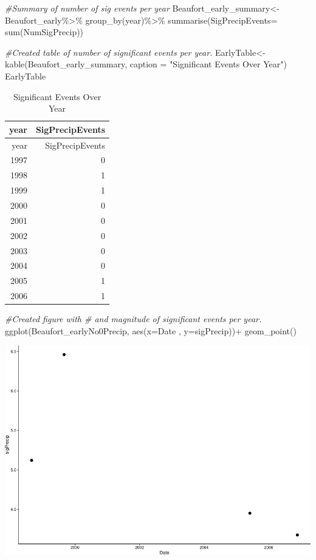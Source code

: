 \documentclass[
  12pt,
]{article}
\newenvironment{Shaded}{\begin{snugshade}}{\end{snugshade}}
\newcommand{\AttributeTok}[1]{\textcolor[rgb]{0.77,0.63,0.00}{#1}}
\newcommand{\CommentTok}[1]{\textcolor[rgb]{0.56,0.35,0.01}{\textit{#1}}}
\newcommand{\FunctionTok}[1]{\textcolor[rgb]{0.00,0.00,0.00}{#1}}
\newcommand{\NormalTok}[1]{#1}
\newcommand{\OtherTok}[1]{\textcolor[rgb]{0.56,0.35,0.01}{#1}}
\newcommand{\SpecialCharTok}[1]{\textcolor[rgb]{0.00,0.00,0.00}{#1}}
\newcommand{\StringTok}[1]{\textcolor[rgb]{0.31,0.60,0.02}{#1}}
\begin{document}
\begin{Shaded}
\begin{Highlighting}[]
\CommentTok{\#Summary of number of sig events per year}
\NormalTok{Beaufort\_early\_summary}\OtherTok{\textless{}{-}}\NormalTok{ Beaufort\_early}\SpecialCharTok{\%\textgreater{}\%}
  \FunctionTok{group\_by}\NormalTok{(year)}\SpecialCharTok{\%\textgreater{}\%}
  \FunctionTok{summarise}\NormalTok{(}\AttributeTok{SigPrecipEvents=} \FunctionTok{sum}\NormalTok{(NumSigPrecip))}

\CommentTok{\#Created table of number of significant events per year.}
\NormalTok{EarlyTable}\OtherTok{\textless{}{-}} \FunctionTok{kable}\NormalTok{(Beaufort\_early\_summary, }\AttributeTok{caption =} \StringTok{"Significant Events Over Year"}\NormalTok{)}
\NormalTok{EarlyTable}
\end{Highlighting}
\end{Shaded}

\begin{longtable}[]{@{}rr@{}}
\caption{Significant Events Over Year}\tabularnewline
\toprule
year & SigPrecipEvents \\
\midrule
\endfirsthead
\toprule
year & SigPrecipEvents \\
\midrule
\endhead
1997 & 0 \\
1998 & 1 \\
1999 & 1 \\
2000 & 0 \\
2001 & 0 \\
2002 & 0 \\
2003 & 0 \\
2004 & 0 \\
2005 & 1 \\
2006 & 1 \\
\bottomrule
\end{longtable}

\begin{Shaded}
\begin{Highlighting}[]
\CommentTok{\#Created figure with \# and magnitude of significant events per year.}
\FunctionTok{ggplot}\NormalTok{(Beaufort\_earlyNo0Precip, }\FunctionTok{aes}\NormalTok{(}\AttributeTok{x=}\NormalTok{Date , }\AttributeTok{y=}\NormalTok{sigPrecip))}\SpecialCharTok{+}
  \FunctionTok{geom\_point}\NormalTok{()}
\end{Highlighting}
\end{Shaded}

\includegraphics{Project_Template_TLK_files/figure-latex/early-1.pdf}
\end{document}
